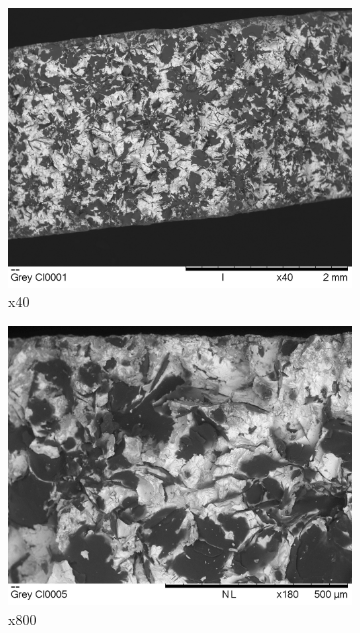 \documentclass[11pt,a4paper]{article}
\begin{document}
\begin{figure} [ht]
\begin{subfigure}{0.335\textwidth}
\includegraphics[scale=0.32]{Grey CI0001(x40).png}
\caption{x40}
\end{subfigure}
\begin{subfigure}{0.335\textwidth}
\includegraphics[scale=0.32]{Grey_CI0005(x180)(2).png}
\caption{x800}
\end{subfigure}
\begin{subfigure}{0.335\textwidth}

\end{subfigure}
\end{figure}
\end{document}
